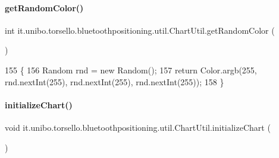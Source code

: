 \paragraph{\texorpdfstring{get\+Random\+Color()}{getRandomColor()}}
{\footnotesize\ttfamily int it.\+unibo.\+torsello.\+bluetoothpositioning.\+util.\+Chart\+Util.\+get\+Random\+Color (\begin{DoxyParamCaption}{ }\end{DoxyParamCaption})\hspace{0.3cm}{\ttfamily [private]}}


\begin{DoxyCode}
155                                  \{
156         Random rnd = \textcolor{keyword}{new} Random();
157         \textcolor{keywordflow}{return} Color.argb(255, rnd.nextInt(255), rnd.nextInt(255), rnd.nextInt(255));
158     \}
\end{DoxyCode}
\hypertarget{classit_1_1unibo_1_1torsello_1_1bluetoothpositioning_1_1util_1_1ChartUtil_aab1a6bd41cbf8228c53d633af6b89bb7_aab1a6bd41cbf8228c53d633af6b89bb7}{}\label{classit_1_1unibo_1_1torsello_1_1bluetoothpositioning_1_1util_1_1ChartUtil_aab1a6bd41cbf8228c53d633af6b89bb7_aab1a6bd41cbf8228c53d633af6b89bb7} 
\paragraph{\texorpdfstring{initialize\+Chart()}{initializeChart()}}
{\footnotesize\ttfamily void it.\+unibo.\+torsello.\+bluetoothpositioning.\+util.\+Chart\+Util.\+initialize\+Chart (\begin{DoxyParamCaption}{ }\end{DoxyParamCaption})}


